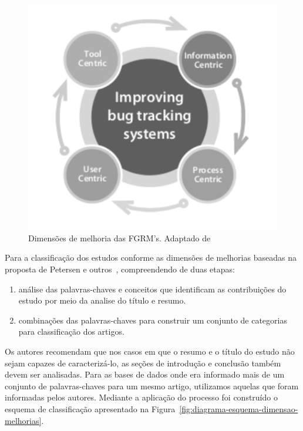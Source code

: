 \begin{figure}[htpb] \centering
	\includegraphics[width=0.666666\linewidth]
	{chapter-intro/img/dimensoes_melhorias_fgrm.pdf}
	\caption{Dimensões de melhoria das FGRM's. Adaptado
		de~\cite{zimmermann2005mining}}\label{fig:dimensoes_melhorias_fgrm}
\end{figure}

Para a classificação dos estudos conforme as dimensões de melhorias baseadas na
proposta de Petersen e outros~\cite{Petersen2008}, compreendendo de duas etapas:

\begin{enumerate}[I]
	\item análise das palavras-chaves e conceitos que
		identificam as contribuições do estudo por meio da analise do título e
		resumo.
	\item combinações das palavras-chaves para construir um conjunto de
		categorias para classificação dos artigos.
\end{enumerate}

Os autores recomendam que nos casos em que o resumo e o título do estudo não
sejam capazes de caracterizá-lo, as seções de introdução e conclusão também
devem ser analisadas. Para as bases de dados onde era informado mais de um
conjunto de palavras-chaves para um mesmo artigo, utilizamos aquelas que foram
informadas pelos autores. Mediante a aplicação do processo foi construído o
esquema de classificação apresentado na
Figura~\ref{fig:diagrama-esquema-dimensao-melhorias}.


